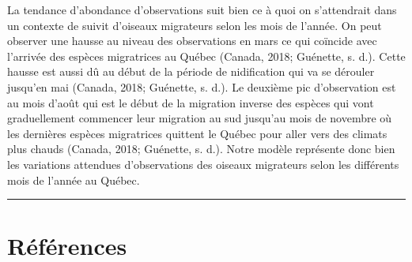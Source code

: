 \documentclass[9pt,twocolumn,twoside,]{pnas-new}
\begin{document}
La tendance d'abondance d'observations suit bien ce à quoi on
s'attendrait dans un contexte de suivit d'oiseaux migrateurs selon les
mois de l'année. On peut observer une hausse au niveau des observations
en mars ce qui coïncide avec l'arrivée des espèces migratrices au Québec
(Canada, 2018; Guénette, s. d.). Cette hausse est aussi dû au début de
la période de nidification qui va se dérouler jusqu'en mai (Canada,
2018; Guénette, s. d.). Le deuxième pic d'observation est au mois d'août
qui est le début de la migration inverse des espèces qui vont
graduellement commencer leur migration au sud jusqu'au mois de novembre
où les dernières espèces migratrices quittent le Québec pour aller vers
des climats plus chauds (Canada, 2018; Guénette, s. d.). Notre modèle
représente donc bien les variations attendues d'observations des oiseaux
migrateurs selon les différents mois de l'année au Québec.

\begin{center}\rule{0.5\linewidth}{0.5pt}\end{center}

\showmatmethods

\hypertarget{references}{%
\section*{Références}\label{references}}

\pnasbreak



% 
\end{document}
